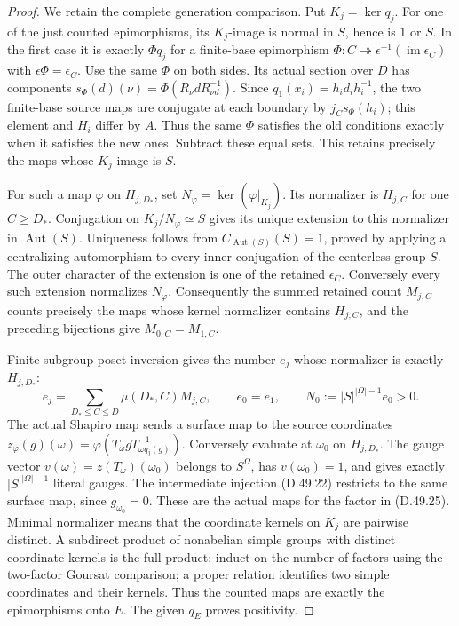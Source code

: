 \begin{proof}
We retain the complete generation comparison. Put \(K_j=\ker q_j\).
For one of the just counted epimorphisms, its \(K_j\)-image is
normal in \(S\), hence is \(1\) or \(S\). In the first case it
is exactly \(\Phi q_j\) for a finite-base epimorphism
\(\Phi:C\twoheadrightarrow\epsilon^{-1}(\operatorname{im}\epsilon_C)\)
with \(\epsilon\Phi=\epsilon_C\).
Use the same \(\Phi\) on both sides. Its actual section over \(D\)
has components
\(s_\Phi(d)(\nu)=\Phi(R_\nu dR_{\nu d}^{-1})\).
Since \(q_1(x_i)=h_id_ih_i^{-1}\), the two finite-base source maps
are conjugate at each boundary by \(j_Cs_\Phi(h_i)\); this element
and \(H_i\) differ by \(A\). Thus the same \(\Phi\) satisfies
the old conditions exactly when it satisfies the new ones.
Subtract these equal sets. This retains precisely the maps whose
\(K_j\)-image is \(S\).

For such a map \(\varphi\) on \(H_{j,D_*}\), set
\(N_\varphi=\ker(\varphi|_{K_j})\).
Its normalizer is \(H_{j,C}\) for one \(C\geq D_*\).
Conjugation on \(K_j/N_\varphi\simeq S\) gives its unique extension
to this normalizer in \(\operatorname{Aut}(S)\).
Uniqueness follows from \(C_{\operatorname{Aut}(S)}(S)=1\), proved
by applying a centralizing automorphism to every inner conjugation
of the centerless group \(S\). The outer character of the extension
is one of the retained \(\epsilon_C\). Conversely every such
extension normalizes \(N_\varphi\).
Consequently the summed retained count \(M_{j,C}\) counts precisely
the maps whose kernel normalizer contains \(H_{j,C}\), and the
preceding bijections give \(M_{0,C}=M_{1,C}\).

Finite subgroup-poset inversion gives the number \(e_j\) whose
normalizer is exactly \(H_{j,D_*}\):
\[
 e_j=\sum_{D_*\leq C\leq D}\mu(D_*,C)M_{j,C},
 \qquad e_0=e_1,
 \qquad N_0:=|S|^{|\Omega|-1}e_0>0.
 \tag{D.49.25}
\]
The actual Shapiro map sends a surface map to the source coordinates
\(z_\varphi(g)(\omega)=
 \varphi(T_\omega gT_{\omega q_j(g)}^{-1})\).
Conversely evaluate at \(\omega_0\) on \(H_{j,D_*}\).
The gauge vector \(v(\omega)=z(T_\omega)(\omega_0)\) belongs to
\(S^\Omega\), has \(v(\omega_0)=1\), and gives exactly
\(|S|^{|\Omega|-1}\) literal gauges. The intermediate injection
\textup{(D.49.22)} restricts to the same surface map, since
\(g_{\omega_0}=0\). These are the actual maps for the factor in
\textup{(D.49.25)}.
Minimal normalizer means that the coordinate kernels on \(K_j\)
are pairwise distinct. A subdirect product of nonabelian simple
groups with distinct coordinate kernels is the full product:
induct on the number of factors using the two-factor Goursat
comparison; a proper relation identifies two simple coordinates
and their kernels. Thus the counted maps are exactly the
epimorphisms onto \(E\). The given \(q_E\) proves positivity.


\end{proof}
